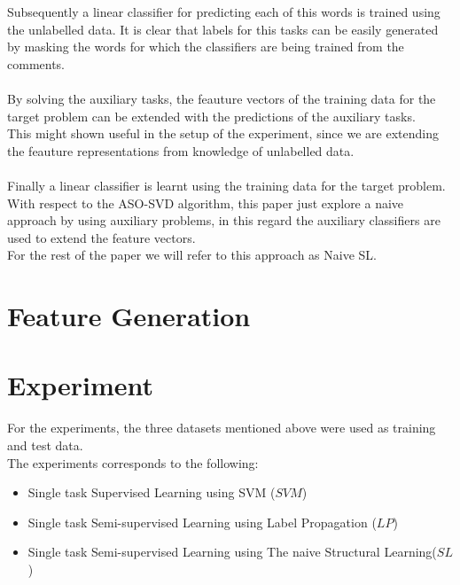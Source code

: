 \documentclass[4pt,a4paper,twocolumn]{article}
\begin{document}
Subsequently a linear classifier for predicting each of this words is trained using the unlabelled data.
It is clear that labels for this tasks can be easily generated by masking the words for which the classifiers are being trained from the comments.\\
\\
By solving the auxiliary tasks, the feauture vectors of the training data for the target problem can be extended with the predictions of the auxiliary tasks.\\
This might shown useful in the setup of the experiment, since we are extending the feauture representations from knowledge of unlabelled data.\\
\\
Finally a linear classifier is learnt using the training data for the target problem.\\
With respect to the ASO-SVD algorithm, this paper just explore a naive approach by using auxiliary problems, in this regard the auxiliary classifiers are used to extend the feature vectors.\\
For the rest of the paper we will refer to this approach as Naive SL.


\section{Feature Generation}

\section{Experiment}
For the experiments, the three datasets mentioned above were used as training and test data.\\
The experiments corresponds to the following:
\begin{itemize}
	\item Single task Supervised Learning using SVM ($SVM$)
	\item Single task Semi-supervised Learning using Label Propagation ($LP$)
	\item Single task Semi-supervised Learning using The naive Structural Learning($SL$)
	
\end{itemize}
\end{document}
